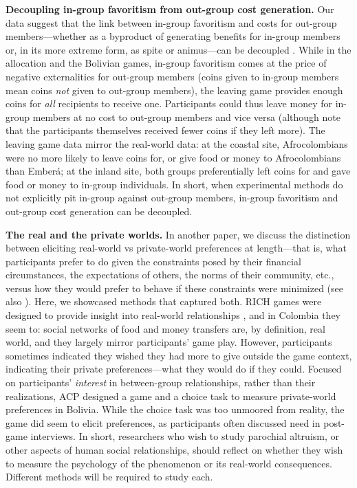 \documentclass[bibauthoryear]{aa}
\begin{document}
\textbf{Decoupling in-group favoritism from out-group cost generation.} Our data suggest that the link between in-group favoritism and costs for out-group members---whether as a byproduct of generating benefits for in-group members or, in its more extreme form, as spite or animus---can be decoupled \citep[see also][]{cashdan2001ethnocentrism, hruschka2013economic, schaub2017threat, yamagishi2016parochial}. While in the allocation and the Bolivian games, in-group favoritism comes at the price of negative externalities for out-group members (coins given to in-group members mean coins \emph{not} given to out-group members), the leaving game provides enough coins for \emph{all} recipients to receive one. Participants could thus leave money for in-group members at no cost to out-group members and vice versa (although note that the participants themselves received fewer coins if they left more). The leaving game data mirror the real-world data: at the coastal site, Afrocolombians were no more likely to leave coins for, or give food or money to Afrocolombians than Ember\'a; at the inland site, both groups preferentially left coins for and gave food or money to in-group individuals. In short, when experimental methods do not explicitly pit in-group against out-group members, in-group favoritism and out-group cost generation can be decoupled.

\textbf{The real and the private worlds.} In another paper, we discuss the distinction between eliciting real-world vs private-world preferences at length---that is, what participants prefer to do given the constraints posed by their financial circumstances, the expectations of others, the norms of their community, etc., versus how they would prefer to behave if these constraints were minimized \citep{Pisor2020} (see also \citet{Naar2020}). Here, we showcased methods that captured both. RICH games were designed to provide insight into real-world relationships \citep{gervais2017rich, Pisor2020}, and in Colombia they seem to: social networks of food and money transfers are, by definition, real world, and they largely mirror participants' game play. However, participants sometimes indicated they wished they had more to give outside the game context, indicating their private preferences---what they would do if they could. Focused on participants' \emph{interest} in between-group relationships, rather than their realizations, ACP designed a game and a choice task to measure private-world preferences in Bolivia. While the choice task was too unmoored from reality, the game did seem to elicit preferences, as participants often discussed need in post-game interviews. In short, researchers who wish to study parochial altruism, or other aspects of human social relationships, should reflect on whether they wish to measure the psychology of the phenomenon or its real-world consequences. Different methods will be required to study each.
\end{document}
